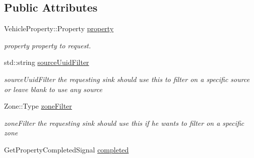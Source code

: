 \subsection*{Public Attributes}
\begin{DoxyCompactItemize}
\item 
\hypertarget{classAsyncPropertyRequest_a221de270e3fb828ddbe821aa484a553f}{Vehicle\+Property\+::\+Property \hyperlink{classAsyncPropertyRequest_a221de270e3fb828ddbe821aa484a553f}{property}}\label{classAsyncPropertyRequest_a221de270e3fb828ddbe821aa484a553f}

\begin{DoxyCompactList}\small\item\em property property to request. \end{DoxyCompactList}\item 
\hypertarget{classAsyncPropertyRequest_a2250e8d29929dd879de141049ec78302}{std\+::string \hyperlink{classAsyncPropertyRequest_a2250e8d29929dd879de141049ec78302}{source\+Uuid\+Filter}}\label{classAsyncPropertyRequest_a2250e8d29929dd879de141049ec78302}

\begin{DoxyCompactList}\small\item\em source\+Uuid\+Filter the requesting sink should use this to filter on a specific source or leave blank to use any source \end{DoxyCompactList}\item 
\hypertarget{classAsyncPropertyRequest_a1a19d4677523d8934abe1ddfec5ba1b7}{Zone\+::\+Type \hyperlink{classAsyncPropertyRequest_a1a19d4677523d8934abe1ddfec5ba1b7}{zone\+Filter}}\label{classAsyncPropertyRequest_a1a19d4677523d8934abe1ddfec5ba1b7}

\begin{DoxyCompactList}\small\item\em zone\+Filter the requesting sink should use this if he wants to filter on a specific zone \end{DoxyCompactList}\item 
\hypertarget{classAsyncPropertyRequest_a12e1115b879ffc69a4d9bfd34df3e4be}{Get\+Property\+Completed\+Signal \hyperlink{classAsyncPropertyRequest_a12e1115b879ffc69a4d9bfd34df3e4be}{completed}}\label{classAsyncPropertyRequest_a12e1115b879ffc69a4d9bfd34df3e4be}


\end{DoxyCompactItemize}
